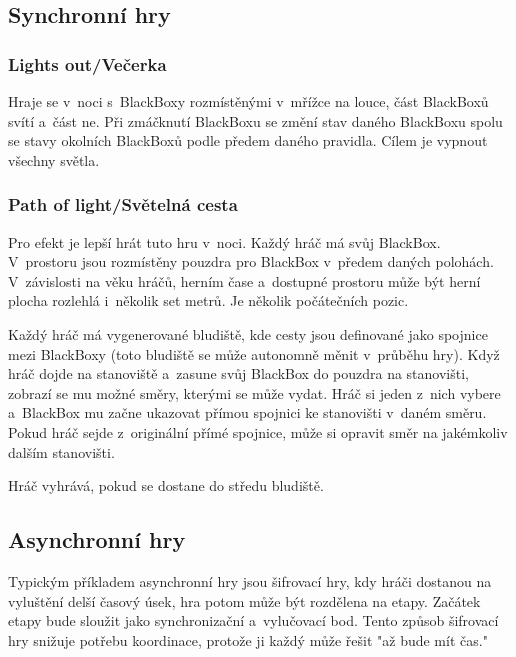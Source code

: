 \subsection{Synchronní hry}

\subsubsection{Lights out/Večerka}

Hraje se v~noci s~BlackBoxy rozmístěnými v~mřížce na louce, část BlackBoxů svítí a~část ne.
Při zmáčknutí BlackBoxu se změní stav daného BlackBoxu spolu se stavy okolních BlackBoxů podle předem daného pravidla.
Cílem je vypnout všechny světla.

\subsubsection{Path of light/Světelná cesta}

Pro efekt je lepší hrát tuto hru v~noci.
Každý hráč má svůj BlackBox.
V~prostoru jsou rozmístěny pouzdra pro BlackBox v~předem daných polohách.
V~závislosti na věku hráčů, herním čase a~dostupné prostoru může být herní plocha rozlehlá i~několik set metrů.
Je několik počátečních pozic.

Každý hráč má vygenerované bludiště, kde cesty jsou definované jako spojnice mezi BlackBoxy (toto bludiště se může autonomně měnit v~průběhu hry).
Když hráč dojde na stanoviště a~zasune svůj BlackBox do pouzdra na stanovišti, zobrazí se mu možné směry, kterými se může vydat.
Hráč si jeden z~nich vybere a~BlackBox mu začne ukazovat přímou spojnici ke stanovišti v~daném směru.
Pokud hráč sejde z~originální přímé spojnice, může si opravit směr na jakémkoliv dalším stanovišti.

Hráč vyhrává, pokud se dostane do středu bludiště.


\subsection{Asynchronní hry}

Typickým příkladem asynchronní hry jsou šifrovací hry, kdy hráči dostanou na vyluštění delší časový úsek, hra potom může být rozdělena na etapy.
Začátek etapy bude sloužit jako synchronizační a~vylučovací bod.
Tento způsob šifrovací hry snižuje potřebu koordinace, protože ji každý může řešit "až bude mít čas."
